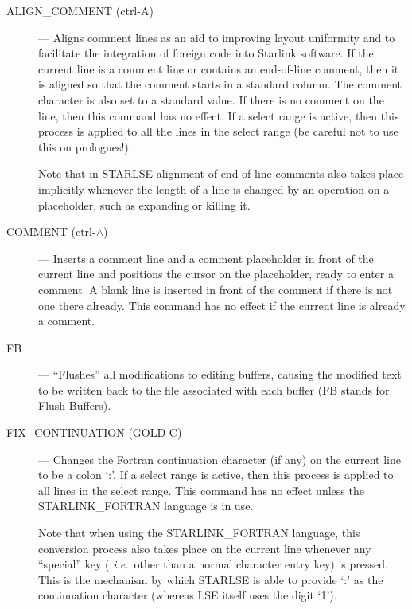 \begin{description}

\item[ALIGN\_COMMENT (ctrl-A)] --- Aligns comment lines as an aid to improving
layout uniformity and to facilitate the integration of foreign code into
Starlink software.
If the current line is a comment line or contains an end-of-line comment,
then it is aligned so that the comment starts in a standard column.
The comment character is also set to a standard value.
If there is no comment on the line, then this command has no effect.
If a select range is active, then this process is applied to all the
lines in the select range (be careful not to use this on prologues!).

Note that in \mbox{STARLSE} alignment of end-of-line comments also takes
place implicitly whenever the length of a line is changed by an operation on
a placeholder, such as expanding or killing it.

\item[COMMENT (ctrl-$\wedge$)\footnotemark] --- Inserts a comment
line and a comment placeholder in front of the current line and positions
the cursor on the placeholder, ready to enter a comment.
A blank line is inserted in front of the comment if there is not one
there already.
This command has no effect if the current line is already a comment.

\item[FB] --- ``Flushes'' all modifications to editing buffers, causing the
modified text to be written back to the file associated with each buffer (FB
stands for Flush Buffers).

\item[FIX\_CONTINUATION (GOLD-C)] --- Changes the Fortran continuation
character (if any) on the current line to be a colon `:'.
If a select range is active, then this process is applied to all lines in
the select range.
This command has no effect unless the \mbox{STARLINK\_FORTRAN} language is in
use.

Note that when using the \mbox{STARLINK\_FORTRAN} language, this conversion
process also takes place on the current line whenever any ``special'' key ({\em
i.e.}\ other than a normal character entry key) is pressed.
This is the mechanism by which \mbox{STARLSE} is able to provide `:' as the
continuation character (whereas \mbox{LSE} itself uses the digit `1').


\end{description}
